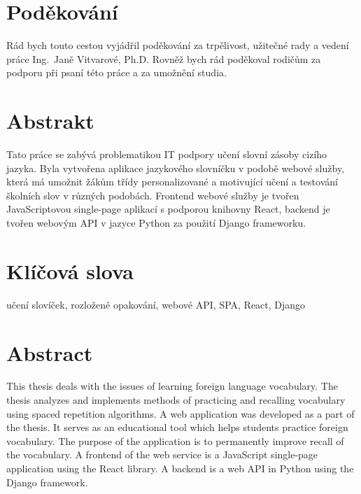 \documentclass[a4paper,11pt,titlepage,fleqn]{article}
\begin{document}



\setcounter{page}{5}

\newpage
\thispagestyle{plain}
\section*{Poděkování}
Rád bych touto cestou vyjádřil poděkování za trpělivost, užitečné rady a vedení práce Ing.~Janě Vitvarové, Ph.D. Rovněž bych rád poděkoval rodičům za podporu při psaní této práce a za umožnění studia.
\thispagestyle{empty}

\newpage
\thispagestyle{plain}
\section*{Abstrakt}
Tato práce se zabývá problematikou IT podpory učení slovní zásoby cizího jazyka. Byla vytvořena aplikace jazykového slovníčku v podobě webové služby, která má umožnit žákům třídy personalizované a motivující učení a testování školních slov v různých podobách. %
Frontend webové služby je tvořen JavaScriptovou single-page aplikací s podporou knihovny React, backend je tvořen webovým API v jazyce Python za použití Django frameworku.


\section*{Klíčová slova}
učení slovíček, rozložené opakování, webové API, SPA, React, Django

\section*{Abstract}
This thesis deals with the issues of learning foreign language vocabulary. The thesis analyzes and implements methods of practicing and recalling vocabulary using spaced repetition algorithms. A web application was developed as a part of the thesis. It serves as an educational tool which helps students practice foreign vocabulary. The purpose of the application is to permanently improve recall of the vocabulary. A frontend of the web service is a JavaScript single-page application using the React library. A backend is a web API in Python using the Django framework. 
\end{document}
